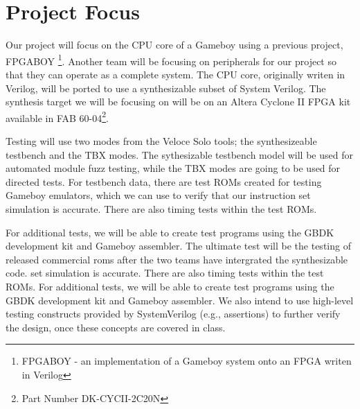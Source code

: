 \section{Project Focus}
Our project will focus on the CPU core of a Gameboy using a previous project,
FPGABOY \footnote{FPGABOY - an implementation of a Gameboy system onto an FPGA 
writen in Verilog}. Another team will be focusing on peripherals for our project 
so that they can operate as a complete system. The CPU core, originally writen 
in Verilog, will be ported to use a synthesizable subset of System Verilog.
The synthesis target we will be focusing on will be on an Altera Cyclone II 
FPGA kit available in FAB 60-04\footnote{Part Number DK-CYCII-2C20N}.

Testing will use two modes from the Veloce Solo tools; the synthesizeable 
testbench and the TBX modes. The sythesizable testbench model will be used for 
automated module fuzz testing, while the TBX modes are going to be used for 
directed tests. For testbench data, there are test ROMs created 
for testing Gameboy emulators, which we can use to verify that our instruction 
set simulation is accurate. There are also timing tests within the test ROMs. 

For additional tests, we will be able to create test programs using the GBDK 
development kit and Gameboy assembler. The ultimate test will be the testing 
of released commercial roms after the two teams have intergrated the 
synthesizable code. set simulation is accurate. There are also timing tests 
within the test ROMs. For additional tests, we will be able to create test 
programs using the GBDK development kit and Gameboy assembler.
We also intend to use high-level testing constructs provided by SystemVerilog 
(e.g., assertions) to further verify the design, once these concepts are 
covered in class. 
